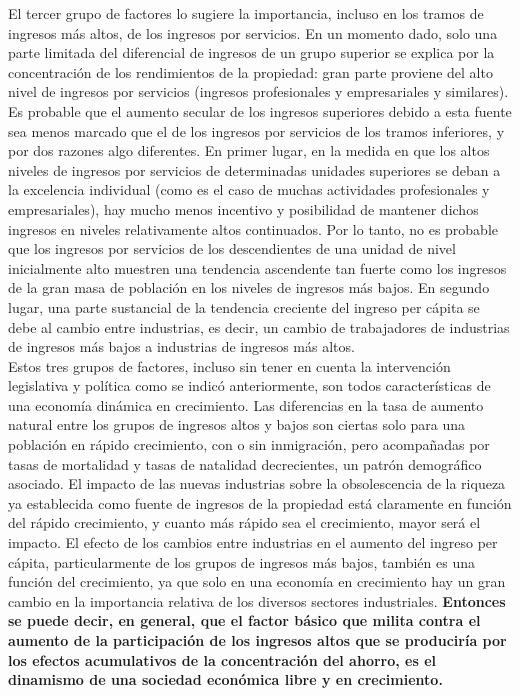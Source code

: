 El tercer grupo de factores lo sugiere la importancia, incluso en los tramos de ingresos más altos, de los ingresos por servicios. En un momento dado, solo una parte limitada del diferencial de ingresos de un grupo superior se explica por la concentración de los rendimientos de la propiedad: gran parte proviene del alto nivel de ingresos por servicios (ingresos profesionales y empresariales y similares). 
Es probable que el aumento secular de los ingresos superiores debido a esta fuente sea menos marcado que el de los ingresos por servicios de los tramos inferiores, y por dos razones algo diferentes. En primer lugar, en la medida en que los altos niveles de ingresos por servicios de determinadas unidades superiores se deban a la excelencia individual (como es el caso de muchas actividades profesionales y empresariales), hay mucho menos incentivo y posibilidad de mantener dichos ingresos en niveles relativamente altos continuados. Por lo tanto, no es probable que los ingresos por servicios de los descendientes de una unidad de nivel inicialmente alto muestren una tendencia ascendente tan fuerte como los ingresos de la gran masa de población en los niveles de ingresos más bajos. En segundo lugar, una parte sustancial de la tendencia creciente del ingreso per cápita se debe al cambio entre industrias, es decir, un cambio de trabajadores de industrias de ingresos más bajos a industrias de ingresos más altos. \\

Estos tres grupos de factores, incluso sin tener en cuenta la intervención legislativa y política como se indicó anteriormente, son todos características de una economía dinámica en crecimiento.  Las diferencias en la tasa de aumento natural entre los grupos de ingresos altos y bajos son ciertas solo para una población en rápido crecimiento, con o sin inmigración, pero acompañadas por tasas de mortalidad y tasas de natalidad decrecientes, un patrón demográfico asociado. 
El impacto de las nuevas industrias sobre la obsolescencia de la riqueza ya establecida como fuente de ingresos de la propiedad está claramente en función del rápido crecimiento, y cuanto más rápido sea el crecimiento, mayor será el impacto.
El efecto de los cambios entre industrias en el aumento del ingreso per cápita, particularmente de los grupos de ingresos más bajos, también es una función del crecimiento, ya que solo en una economía en crecimiento hay un gran cambio en la importancia relativa de los diversos sectores industriales. \textbf{Entonces se puede decir, en general, que el factor básico que milita contra el aumento de la participación de los ingresos altos que se produciría por los efectos acumulativos de la concentración del ahorro, es el dinamismo de una sociedad económica libre y en crecimiento.}\\

